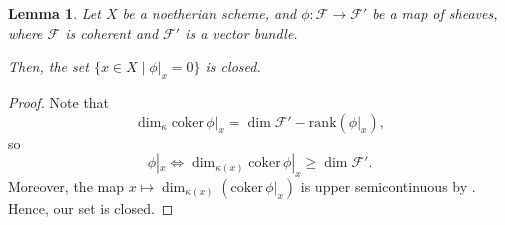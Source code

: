 \documentclass[a4paper,12pt]{amsart}
\newtheorem{lemma}[theorem]{Lemma}
\theoremstyle{definition} %
\theoremstyle{remark}
\numberwithin{equation}{section}
\begin{document}
\begin{lemma} \label{duidui2}
Let $X$ be a noetherian scheme, and $\phi:\mathcal{F}\to \mathcal{F}'$ be a map of sheaves, where $\mathcal{F}$ is coherent and $\mathcal{F}'$ is a vector bundle.

\smallskip

Then, the set $\{x\in X\mid \phi|_x=0\}$ is closed.
\end{lemma}

\begin{proof}
Note that
$$ \dim_{\kappa}\mathrm{coker}\,\phi|_x=\dim \mathcal{F}'-\mathrm{rank}(\phi|_x),$$
so
$$ \phi|_x\iff \dim_{\kappa(x)}\mathrm{coker}\,\phi|_x\ge \dim \mathcal{F}'.$$
Moreover, the map $x\mapsto \dim_{\kappa(x)}(\mathrm{coker}\,\phi|_x)$ is upper semicontinuous by \cite[Exercise 2.5.8(a)]{Har77}. Hence, our set is closed.
\end{proof}
\end{document}
